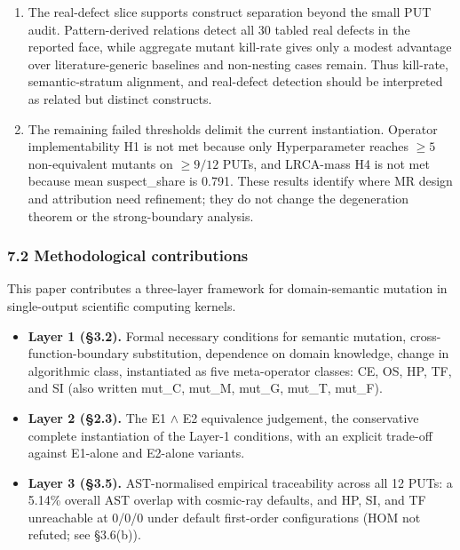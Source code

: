 \documentclass[review,12pt,authoryear]{elsarticle}
\providecommand{\tightlist}{\setlength{\itemsep}{0pt}\setlength{\parskip}{0pt}}
\begin{document}
\begin{enumerate}
  and Pattern Coverage is 0.163 at \(n = 12\), so orthogonality remains
  a future hypothesis.
\item
  The real-defect slice supports construct separation beyond the small
  PUT audit. Pattern-derived relations detect all 30 tabled real defects
  in the reported face, while aggregate mutant kill-rate gives only a
  modest advantage over literature-generic baselines and non-nesting
  cases remain. Thus kill-rate, semantic-stratum alignment, and
  real-defect detection should be interpreted as related but distinct
  constructs.
\item
  The remaining failed thresholds delimit the current instantiation.
  Operator implementability H1 is not met because only Hyperparameter
  reaches \(\geq 5\) non-equivalent mutants on \(\geq 9/12\) PUTs, and
  LRCA-mass H4 is not met because mean suspect\_share is 0.791. These
  results identify where MR design and attribution need refinement; they
  do not change the degeneration theorem or the strong-boundary
  analysis.
\end{enumerate}

\subsubsection{7.2 Methodological contributions}\label{methodological-contributions}

This paper contributes a three-layer framework for domain-semantic
mutation in single-output scientific computing kernels.

\begin{itemize}
\tightlist
\item
  \textbf{Layer 1 (§3.2).} Formal necessary conditions for semantic
  mutation, cross-function-boundary substitution, dependence on domain
  knowledge, change in algorithmic class, instantiated as five
  meta-operator classes: CE, OS, HP, TF, and SI (also written mut\_C,
  mut\_M, mut\_G, mut\_T, mut\_F).
\item
  \textbf{Layer 2 (§2.3).} The E1 $\wedge$ E2 equivalence judgement, the
  conservative complete instantiation of the Layer-1 conditions, with an
  explicit trade-off against E1-alone and E2-alone variants.
\item
  \textbf{Layer 3 (§3.5).} AST-normalised empirical traceability across
  all 12 PUTs: a 5.14\% overall AST overlap with cosmic-ray defaults,
  and HP, SI, and TF unreachable at 0/0/0 under default first-order
  configurations (HOM not refuted; see §3.6(b)).
\end{itemize}
\end{document}

